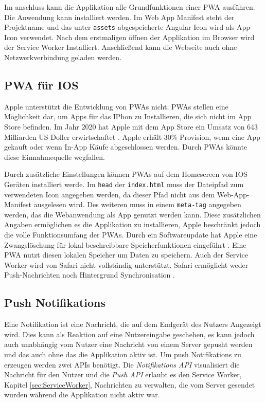 Im anschluss kann die Applikation alle Grundfunktionen einer PWA ausführen. Die Anwendung kann installiert werden. Im Web App Manifest steht der Projektname und das unter \texttt{assets} abgespeicherte Angular Icon wird als App-Icon verwendet. Nach dem erstmaligen öffnen der Applikation im Browser wird der Service Worker Installiert. Anschließend kann die Webseite auch ohne Netzwerkverbindung geladen werden.  



\subsection{PWA für IOS}

Apple unterstützt die Entwicklung von PWAs nicht. PWAs stellen  eine Möglichkeit dar, um Apps für das IPhon zu Installieren, die sich nicht im App Store befinden. Im Jahr 2020 hat Apple mit dem App Store ein Umsatz von 643 Milliarden US-Doller erwirtschaftet \cite{Kirchenbauer2021}. Apple erhält 30\% Provision, wenn eine App gekauft oder wenn In-App Käufe abgeschlossen werden. Durch PWAs könnte diese Einnahmequelle wegfallen. 

Durch zusätzliche Einstellungen können PWAs auf dem Homescreen von IOS Geräten installiert werde. Im \texttt{head} der \texttt{index.html} muss der Dateipfad zum verwendeten Icon angegeben werden, da dieser Pfad nicht aus dem Web-App-Manifest ausgelesen wird. 
Des weiteren muss in einem \texttt{meta-tag} angegeben werden, das die Webanwendung als App genutzt werden kann. Diese zusätzlichen Angaben ermöglichen es die Applikation zu installieren, Apple beschränkt jedoch die volle Funktionsumfang der PWAs. Durch ein Softwareupdate hat Apple eine Zwangslöschung für lokal beschreibbare Speicherfunktionen eingeführt \cite{t3n2020}. Eine PWA nutzt diesen lokalen Speicher um Daten zu speichern. 
Auch der Service Worker wird von Safari nicht vollständig unterstützt. Safari ermöglicht weder Push-Nachrichten noch Hintergrund Synchronisation \cite{mediaevent}. 

\subsection{Push Notifikations}

Eine Notifikation ist eine Nachricht, die auf dem Endgerät des Nutzers Angezeigt wird. Dies kann als Reaktion auf eine Nutzereingabe geschehen, es kann jedoch auch unabhängig vom Nutzer eine Nachricht von einem Server \glqq gepusht\grqq{} werden und das auch ohne das die Applikation aktiv ist.  Um push Notifikations zu erzeugen werden zwei APIs benötigt. Die \textit{Notifikations API} visualisiert die Nachricht für den Nutzer und die \textit{Push API} erlaubt es den Service Worker, Kapitel \ref{sec:ServiceWorker}, Nachrichten zu verwalten, die vom Server gesendet wurden während die Applikation nicht aktiv war. 

